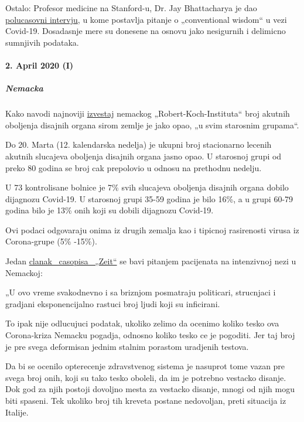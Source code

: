 Ostalo: Profesor medicine na Stanford-u, Dr. Jay Bhattacharya je dao
\href{https://www.youtube.com/watch?v=-UO3Wd5urg0}{polucasovni
intervju}, u kome postavlja pitanje o „conventional wisdom`` u vezi
Covid-19. Dosadasnje mere su donesene na osnovu jako nesigurnih i
delimicno sumnjivih podataka.

\hypertarget{2-april-2020-i}{%
\paragraph{2. April 2020 (I)}\label{2-april-2020-i}}

\hypertarget{nemacka}{%
\subparagraph{\texorpdfstring{\textbf{Nemacka}}{Nemacka}}\label{nemacka}}

Kako navodi najnoviji
\href{https://influenza.rki.de/Wochenberichte/2019_2020/2020-13.pdf}{izvestaj}
nemackog „Robert-Koch-Instituta`` broj akutnih oboljenja disajnih organa
sirom zemlje je jako opao, „u svim starosnim grupama``.

Do 20. Marta (12. kalendarska nedelja) je ukupni broj stacionarno
lecenih akutnih slucajeva oboljenja disajnih organa jasno opao. U
starosnoj grupi od preko 80 godina se broj cak prepolovio u odnosu na
prethodnu nedelju.

U 73 kontrolisane bolnice je 7\% svih slucajeva oboljenja disajnih
organa dobilo dijagnozu Covid-19. U starosnoj grupi 35-59 godina je bilo
16\%, a u grupi 60-79 godina bilo je 13\% onih koji su dobili dijagnozu
Covid-19.

Ovi podaci odgovaraju onima iz drugih zemalja kao i tipicnoj rasirenosti
virusa iz Corona-grupe (5\% -15\%).

Jedan
\href{https://www.zeit.de/zustimmung?url=https\%3A\%2F\%2Fwww.zeit.de\%2Fwissen\%2F2020-04\%2Fkrankenhaeuser-kapazitaeten-coronavirus-patienten-deutschland\%2Fseite-2}{clanak
~casopisa ~„Zeit``} se bavi pitanjem pacijenata na intenzivnoj nezi u
Nemackoj:

„U ovo vreme svakodnevno i sa briznjom posmatraju politicari, strucnjaci
i gradjani eksponencijalno rastuci broj ljudi koji su inficirani.

To ipak nije odlucujuci podatak, ukoliko zelimo da ocenimo koliko tesko
ova Corona-kriza Nemacku pogadja, odnosno koliko tesko ce je pogoditi.
Jer taj broj je pre svega deformisan jednim stalnim porastom uradjenih
testova.

Da bi se ocenilo opterecenje zdravstvenog sistema je nasuprot tome vazan
pre svega broj onih, koji su tako tesko oboleli, da im je potrebno
vestacko disanje. Dok god za njih postoji dovoljno mesta za vestacko
disanje, mnogi od njih mogu biti spaseni. Tek ukoliko broj tih kreveta
postane nedovoljan, preti situacija iz Italije.

